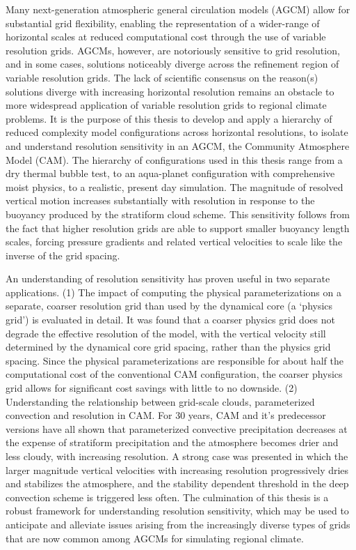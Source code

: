 Many next-generation atmospheric general circulation models (AGCM) allow for substantial grid flexibility, enabling the representation of a wider-range of horizontal scales at reduced computational cost through the use of variable resolution grids. AGCMs, however, are notoriously sensitive to grid resolution, and in some cases, solutions noticeably diverge across the refinement region of variable resolution grids. The lack of scientific consensus on the reason(s) solutions diverge with increasing horizontal resolution remains an obstacle to more widespread application of variable resolution grids to regional climate problems. It is the purpose of this thesis to develop and apply a hierarchy of reduced complexity model configurations across horizontal resolutions, to isolate and understand resolution sensitivity in an AGCM, the Community Atmosphere Model (CAM). The hierarchy of configurations used in this thesis range from a dry thermal bubble test, to an aqua-planet configuration with comprehensive moist physics, to a realistic, present day simulation. The magnitude of resolved vertical motion increases substantially with resolution in response to the buoyancy produced by the stratiform cloud scheme. This sensitivity follows from the fact that higher resolution grids are able to support smaller buoyancy length scales, forcing pressure gradients and related vertical velocities to scale like the inverse of the grid spacing.

An understanding of resolution sensitivity has proven useful in two separate applications. (1) The impact of computing the physical parameterizations on a separate, coarser resolution grid than used by the dynamical core (a `physics grid') is evaluated in detail. It was found that a coarser physics grid does not degrade the effective resolution of the model, with the vertical velocity still determined by the dynamical core grid spacing, rather than the physics grid spacing. Since the physical parameterizations are responsible for about half the computational cost of the conventional CAM configuration, the coarser physics grid allows for significant cost savings with little to no downside. (2) Understanding the relationship between grid-scale clouds, parameterized convection and resolution in CAM. For 30 years, CAM and it's predecessor versions have all shown that parameterized convective precipitation decreases at the expense of stratiform precipitation and the atmosphere becomes drier and less cloudy, with increasing resolution. A strong case was presented in which the larger magnitude vertical velocities with increasing resolution progressively dries and stabilizes the atmosphere, and the stability dependent threshold in the deep convection scheme is triggered less often. The culmination of this thesis is a robust framework for understanding resolution sensitivity, which may be used to anticipate and alleviate issues arising from the increasingly diverse types of grids that are now common among AGCMs for simulating regional climate.